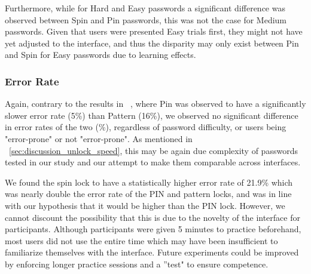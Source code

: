 \documentclass{sigchi}
\begin{document}
Furthermore, while for Hard and Easy passwords a significant difference was observed between Spin and Pin passwords, this was not the case for Medium passwords. Given that users were presented Easy trials first, they might not have yet adjusted to the interface, and thus the disparity may only exist between Pin and Spin for Easy passwords due to learning effects. 








\subsubsection{Error Rate}

Again, contrary to the results in ~\cite{von_zezschwitz_patterns_2013}, where Pin was observed to have a significantly slower error rate (5\%) than Pattern (16\%), we observed no significant difference in error rates of the two (\%), regardless of password difficulty, or users being "error-prone" or not "error-prone". As mentioned in ~\ref{sec:discussion_unlock_speed}, this may be again due complexity of passwords tested in our study and our attempt to make them comparable across interfaces. 

We found the spin lock to have a statistically higher error rate of 21.9\% which was nearly double the error rate of the PIN and pattern locks, and was in line with our hypothesis that it would be higher than the PIN lock. However, we cannot discount the possibility that this is due to the novelty of the interface for participants. Although participants were given 5 minutes to practice beforehand, most users did not use the entire time which may have been insufficient to familiarize themselves with the interface. Future experiments could be improved by enforcing longer practice sessions and a ''test" to ensure competence. 
\end{document}
